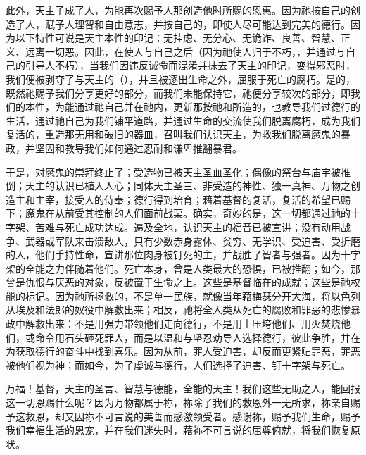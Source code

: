此外，天主子成了人，为能再次赐予人那创造他时所赐的恩惠。因为祂按自己的创造了人，赋予人理智和自由意志，并按自己的，即使人尽可能达到完美的德行。因为以下特性可说是天主本性的印记：无挂虑、无分心、无诡诈、良善、智慧、正义、远离一切恶。因此，在使人与自己之后（因为祂使人归于不朽，，并通过与自己的引导人不朽），当我们因违反诫命而混淆并抹去了天主的印记，变得邪恶时，我们便被剥夺了与天主的（），并且被逐出生命之外，屈服于死亡的腐朽。是的，既然祂赐予我们分享更好的部分，而我们未能保持它，祂便分享较次的部分，即我们的本性，为能通过祂自己并在祂内，更新那按祂和所造的，也教导我们过德行的生活，通过祂自己为我们铺平道路，并通过生命的交流使我们脱离腐朽，成为我们复活的，重造那无用和破旧的器皿，召叫我们认识天主，为救我们脱离魔鬼的暴政，并坚固和教导我们如何通过忍耐和谦卑推翻暴君。\par

于是，对魔鬼的崇拜终止了；受造物已被天主圣血圣化；偶像的祭台与庙宇被推倒；天主的认识已植入人心；同体天主圣三、非受造的神性、独一真神、万物之创造主和主宰，接受人的侍奉；德行得到培育；藉着基督的复活，复活的希望已赐下；魔鬼在从前受其控制的人们面前战栗。确实，奇妙的是，这一切都通过祂的十字架、苦难与死亡成功达成。遍及全地，认识天主的福音已被宣讲；没有动用战争、武器或军队来击溃敌人，只有少数赤身露体、贫穷、无学识、受迫害、受折磨的人，他们手持性命，宣讲那位肉身被钉死的主，并战胜了智者与强者。因为十字架的全能之力伴随着他们。死亡本身，曾是人类最大的恐惧，已被推翻；如今，那曾是仇恨与厌恶的对象，反被置于生命之上。这些是基督临在的成就；这些是祂权能的标记。因为祂所拯救的，不是单一民族，就像当年藉梅瑟分开大海，将以色列从埃及和法郎的奴役中解救出来；相反，祂将全人类从死亡的腐败和罪恶的悲惨暴政中解救出来：不是用强力带领他们走向德行，不是用土压垮他们、用火焚烧他们，或命令用石头砸死罪人，而是以温和与坚忍劝导人选择德行，彼此争胜，并在为获取德行的奋斗中找到喜乐。因为从前，罪人受迫害，却反而更紧贴罪恶，罪恶被他们视为神；而如今，为了虔诚与德行，人们选择了迫害、钉十字架与死亡。\par

万福！基督，天主的圣言、智慧与德能，全能的天主！我们这些无助之人，能回报这一切恩赐什么呢？因为万物都属于祢，祢除了我们的救恩外一无所求，祢亲自赐予这救恩，却又因祢不可言说的美善而感激领受者。感谢祢，赐予我们生命，赐予我们幸福生活的恩宠，并在我们迷失时，藉祢不可言说的屈尊俯就，将我们恢复原状。\par

